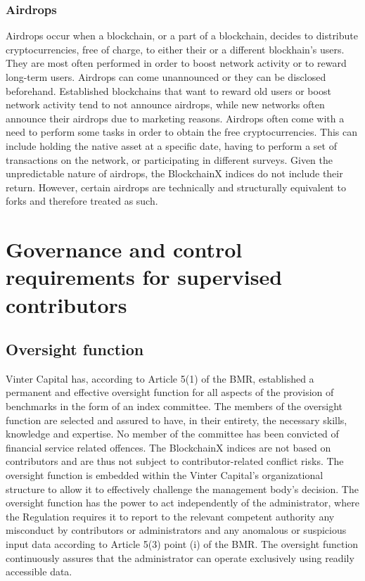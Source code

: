 \documentclass{article}
\begin{document}
\subsubsection{Airdrops}\label{airdrops}

Airdrops occur when a blockchain, or a part of a blockchain, decides to
distribute cryptocurrencies, free of charge, to either their or a
different blockhain's users. They are most often performed in order to
boost network activity or to reward long-term users. Airdrops can come
unannounced or they can be disclosed beforehand. Established blockchains
that want to reward old users or boost network activity tend to not
announce airdrops, while new networks often announce their airdrops due
to marketing reasons. Airdrops often come with a need to perform some
tasks in order to obtain the free cryptocurrencies. This can include
holding the native asset at a specific date, having to perform a set of
transactions on the network, or participating in different surveys.
Given the unpredictable nature of airdrops, the BlockchainX indices do
not include their return. However, certain airdrops are technically and
structurally equivalent to forks and therefore treated as such.

\section{Governance and control requirements for supervised
contributors}\label{governance-and-control-requirements-for-supervised-contributors}

\subsection{Oversight function}\label{oversight-function}

Vinter Capital has, according to Article 5(1) of the BMR, established a
permanent and effective oversight function for all aspects of the
provision of benchmarks in the form of an index committee. The members
of the oversight function are selected and assured to have, in their
entirety, the necessary skills, knowledge and expertise. No member of
the committee has been convicted of financial service related offences.
The BlockchainX indices are not based on contributors and are thus not
subject to contributor-related conflict risks. The oversight function is
embedded within the Vinter Capital's organizational structure to allow
it to effectively challenge the management body's decision. The
oversight function has the power to act independently of the
administrator, where the Regulation requires it to report to the
relevant competent authority any misconduct by contributors or
administrators and any anomalous or suspicious input data according to
Article 5(3) point (i) of the BMR. The oversight function continuously
assures that the administrator can operate exclusively using readily
accessible data.
\end{document}
